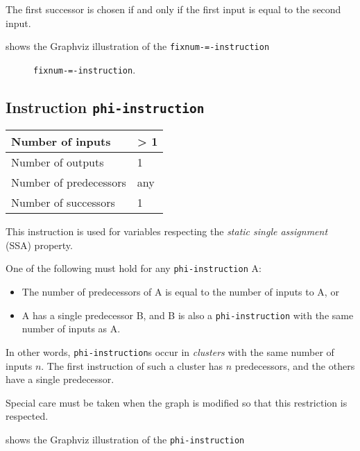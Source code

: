 The first successor is chosen if and only if the first input is equal
to the second input.

 shows the Graphviz illustration of the
\texttt{fixnum-=-instruction}

\begin{figure}
\begin{center}
\end{center}
\caption{\label{fig-fixnum-equal-instruction}
\texttt{fixnum-=-instruction}.}
\end{figure}

\subsection{Instruction \texttt{phi-instruction}}
\label{mir-instruction-phi}

\begin{tabular}{|l|l|}
\hline
Number of inputs & > 1\\
\hline
Number of outputs & 1\\
\hline
Number of predecessors & any\\
\hline
Number of successors & 1\\
\hline
\end{tabular}

This instruction is used for variables respecting the \emph{static
  single assignment} (SSA) property.  

One of the following must hold for any \texttt{phi-instruction} A:

\begin{itemize}
\item The number of predecessors of A is equal to the number of inputs
  to A, or
\item A has a single predecessor B, and B is also a
  \texttt{phi-instruction} with the same number of inputs as A.
\end{itemize}

In other words, \texttt{phi-instruction}s occur in \emph{clusters}
with the same number of inputs $n$.  The first instruction of such a
cluster has $n$ predecessors, and the others have a single
predecessor. 

Special care must be taken when the graph is modified so that this
restriction is respected. 

 shows the Graphviz illustration of the
\texttt{phi-instruction}

